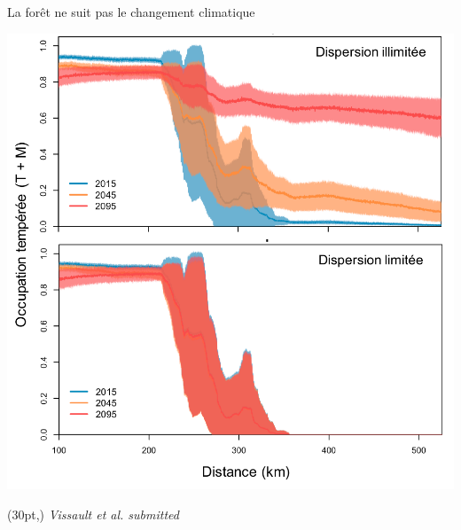\documentclass[11pt, compress, aspectratio=1610]{beamer}
\newcommand\smallcitation[1]{%
\begin{textblock*}{\textwidth}(30pt,\textheight)
	\raggedleft \footnotesize\textit{#1}
\end{textblock*}}
\begin{document}
\begin{frame}{La forêt ne suit pas le changement climatique}

\centering
 \includegraphics[scale=0.4]{figures/Vissault.pdf}\par

\smallcitation{Vissault et al. submitted}

\end{frame}
\end{document}
